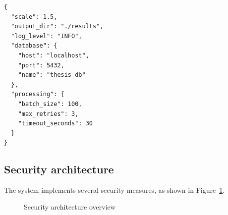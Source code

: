 \begin{lstlisting}[caption={Example configuration file (config.json)}, label={lst:config}]
{
  "scale": 1.5,
  "output_dir": "./results",
  "log_level": "INFO",
  "database": {
    "host": "localhost",
    "port": 5432,
    "name": "thesis_db"
  },
  "processing": {
    "batch_size": 100,
    "max_retries": 3,
    "timeout_seconds": 30
  }
}
\end{lstlisting}

\subsection{Security architecture}

The system implements several security measures, as shown in Figure~\ref{fig:security}.

\begin{figure}[H]
    \centering
    \caption{Security architecture overview} \label{fig:security}
\end{figure}

\clearpage
